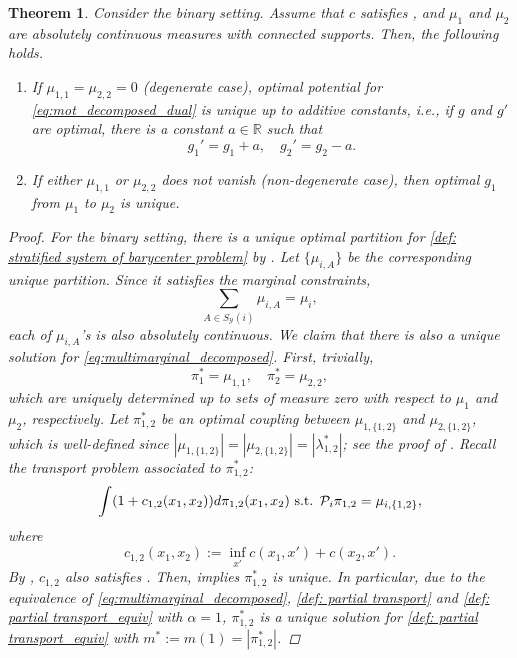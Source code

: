 \documentclass{amsart}
\theoremstyle{plain}
\numberwithin{equation}{section}\newtheorem{theorem}{Theorem}[section]
\theoremstyle{remark}
\begin{document}
\begin{theorem}\label{thm: uniquness of potential}
Consider the binary setting. Assume that $c$ satisfies , and $\mu_1$ and $\mu_2$ are absolutely continuous measures with connected supports. Then, the following holds.
\begin{enumerate}
    \item[(i)] If $\mu_{1,1}=\mu_{2,2}=0$ (degenerate case), optimal potential for \eqref{eq:mot_decomposed_dual} is unique up to additive constants, i.e., if $g$ and $g'$ are optimal, there is a constant $a \in \mathbb{R}$ such that
\[
    g_1' = g_1 + a, \quad g_2'=g_2 - a.
\]
    \item[(ii)] If either $\mu_{1,1}$ or $\mu_{2,2}$ does not vanish (non-degenerate case), then optimal $g_1$ from $\mu_1$ to $\mu_2$ is unique.
\end{enumerate}






\begin{proof}
For the binary setting, there is a unique optimal partition for \eqref{def: stratified system of barycenter problem} by . Let $\{\mu_{i,A}\}$ be the corresponding unique partition. Since it satisfies the marginal constraints,
\[
    \sum_{A \in S_\mathcal{Y}(i)} \mu_{i, A}= \mu_i,
\]
each of $\mu_{i, A}$'s is also absolutely continuous. We claim that there is also a unique solution for \eqref{eq:multimarginal_decomposed}. First, trivially,
\[
    \pi^*_1= \mu_{1,1}, \quad \pi^*_2 = \mu_{2,2},
\]
which are uniquely determined up to sets of measure zero with respect to $\mu_1$ and $\mu_2$, respectively. Let $\pi^*_{1,2}$ be an optimal coupling between $\mu_{1,\{1,2\}}$ and $\mu_{2, \{1,2\}}$, which is well-defined since $| \mu_{1,\{1,2\}}| = | \mu_{2, \{1,2\}} | = |\lambda^*_{1,2}|$; see the proof of . Recall the transport problem associated to $\pi^*_{1,2}$:
\begin{equation}\label{eq: pi_{1,2}}
    \int (1 + c_{1,2}(x_1, x_2)) d\pi_{1,2}(x_1, x_2) \text{ s.t. } \mathcal{P}_i\pi_{1,2} = \mu_{i, \{1,2\}},
\end{equation}
where
\[
    c_{1,2}(x_1, x_2) := \inf_{x'} c(x_1, x') + c(x_2, x').
\]
By , $c_{1,2}$ also satisfies . Then, \cite[Theorem 2.4]{CLT_general_transport2024} implies $\pi^*_{1,2}$ is unique. In particular, due to the equivalence of \eqref{eq:multimarginal_decomposed}, \eqref{def: partial transport} and \eqref{def: partial transport_equiv} with $\alpha=1$, $\pi^*_{1,2}$ is a unique solution for \eqref{def: partial transport_equiv} with $m^*:=m(1)=|\pi^*_{1,2}|$.





\end{proof}
\end{theorem}
\end{document}
